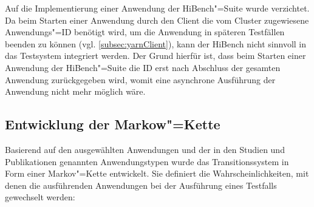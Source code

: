 Auf die Implementierung einer Anwendung der HiBench"=Suite wurde verzichtet.
Da beim Starten einer Anwendung durch den Client die vom Cluster zugewiesene Anwendungs"=ID benötigt wird, um die Anwendung in späteren Testfällen beenden zu können (vgl. \cref{subsec:yarnClient}), kann der HiBench nicht sinnvoll in das Testsystem integriert werden.
Der Grund hierfür ist, dass beim Starten einer Anwendung der HiBench"=Suite die ID erst nach Abschluss der gesamten Anwendung zurückgegeben wird, womit eine asynchrone Ausführung der Anwendung nicht mehr möglich wäre.

\subsection{Entwicklung der Markow"=Kette}
\label{subsec:markovChain}

Basierend auf den ausgewählten Anwendungen und der in den Studien und Publikationen \cite{Huang2010,Chen2012,HadoopDataTypes,Ren2013,Shvachko2010,Dean2004,Graves2013} genannten Anwendungstypen wurde das Transitionssystem in Form einer Markov"=Kette entwickelt.
Sie definiert die Wahrscheinlichkeiten, mit denen die ausführenden Anwendungen bei der Ausführung eines Testfalls gewechselt werden:

